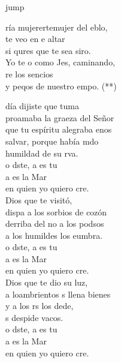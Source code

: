 \begin{cancion}jump\\
	\begin{chorus}%
		ría mujerertemujer del eblo,\\
		 te veo en e altar\\
		si qures que te sea siro.\\
		Yo te o como Jes, caminando,\\
		re los sencios \\
		y peqos de nuestro empo. (**)\jump\\
	\end{chorus}%
	 día dijiste que tuma\\
	proamaba la graeza del Señor\\
	que tu espíritu alegraba enos\\
	 salvar, porque había mdo\\
	humildad de su rva.   \\
	o dste, a es tu  \\
	a es la Mar \\
	en quien yo quiero cre.\\
	\jump
	 Dios que te visitó,\\
	dispa a los sorbios de cozón\\
	derriba del no a los podsos\\
	a los humildes los eumbra.\\
	o dste, a es tu  \\
	a es la Mar \\
	en quien yo quiero cre.\\
	\jump
	 Dios que te dio su luz,\\
	a loambrientos s llena  bienes\\
	y a los rs los dede,\\
	s despide vacos.\\
	o dste, a es tu  \\
	a es la Mar \\
	en quien yo quiero cre.\\
\end{cancion}%
